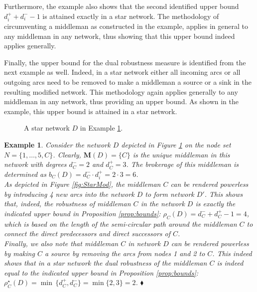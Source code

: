 \documentclass[11pt,fleqn]{article}
\newtheorem{expl}[theorem]{Example}
\newenvironment{example}{\begin{expl} \rm}{\hfill $\blacklozenge$ \end{expl}}{}
\begin{document}
Furthermore, the example also shows that the second identified upper bound $d^+_i + d^-_i -1$ is attained exactly in a star network. The methodology of circumventing a middleman as constructed in the example, applies in general to any middleman in any network, thus showing that this upper bound indeed applies generally.

Finally, the upper bound for the dual robustness measure is identified from the next example as well. Indeed, in a star network either all incoming arcs or all outgoing arcs need to be removed to make a middleman a source or a sink in the resulting modified network. This methodology again applies generally to any middleman in any network, thus providing an upper bound. As shown in the example, this upper bound is attained in a star network.

\begin{figure}[h]
\begin{center}
\end{center}
\caption{A star network $D$ in Example \ref{ex:Star}.}
\label{fig:Star}
\end{figure}

\begin{example} \label{ex:Star}
	Consider the network $D$ depicted in Figure \ref{fig:Star} on the node set $N = \{ 1, \ldots ,5,C \}$. Clearly, $\mathbf M (D) = \{ C \}$ is the unique middleman in this network with degrees $d^-_C =2$ and $d^+_C =3$. The brokerage of this middleman is determined as $b_C (D) = d^-_C \cdot d^+_i = 2 \cdot 3 =6$.
	\\
	As depicted in Figure \ref{fig:StarMod}, the middleman $C$ can be rendered powerless by introducing 4 new arcs into the network $D$ to form network $D'$. This shows that, indeed, the robustness of middleman $C$ in the network $D$ is exactly the indicated upper bound in Proposition \ref{prop:bounds}: $\rho_C (D) = d^-_C + d^+_C -1 =4$, which is based on the length of the semi-circular path around the middleman $C$ to connect the direct predecessors and direct successors of $C$.
	\\
	Finally, we also note that middleman $C$ in network $D$ can be rendered powerless by making $C$ a source by removing the arcs from nodes 1 and 2 to $C$. This indeed shows that in a star network the dual robustness of the middleman $C$ is indeed equal to the indicated upper bound in Proposition \ref{prop:bounds}: $\rho_C^{\star} (D) = \min \, \{ d^+_C , d^-_C \} = \min \{ 2,3 \} =2$.
\end{example}
\end{document}
